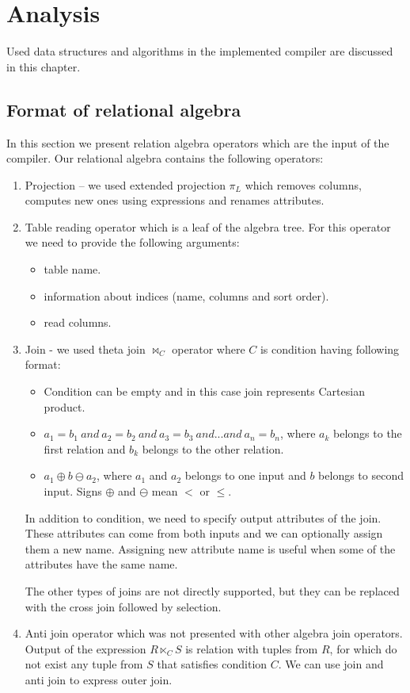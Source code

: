 \chapter{Analysis}
\label{analysis}
Used data structures and algorithms in the implemented compiler are discussed in this chapter.
\section{Format of relational algebra}

In this section we present relation algebra operators which are the input of the compiler. Our relational algebra contains the following operators:
\begin{enumerate}
\item Projection -- we used extended projection $\pi_L$ which removes columns, computes new ones using expressions and renames attributes.

\item Table reading operator which is a leaf of the algebra tree. For this operator we need to provide the following arguments:
\begin{itemize}
\item table name.
\item information about indices (name, columns and sort order).
\item read columns.
\end{itemize}
\item Join - we used theta join $\Join_C$ operator where $C$ is condition having following format:
\begin{itemize}
\item Condition can be empty and in this case join represents Cartesian product.
\item $a_1=b_1~and~a_2=b_2~and~a_3=b_3~and...and~a_n=b_n$, where $a_k$ belongs to the first relation and $b_k$ belongs to the other relation.
\item $a_1\oplus b \ominus a_2$, where $a_1$ and $a_2$ belongs to one input and $b$ belongs to second input. Signs $\oplus$ and $\ominus$ mean $<$ or $\leq$.

\end{itemize}

In addition to condition, we need to specify output attributes of the join. These attributes can come from both inputs and we can optionally assign them a new name. Assigning new attribute name is useful when some of the attributes have the same name.

The other types of joins are not directly supported, but they can be replaced with the cross join followed by selection.
\item Anti join operator which was not presented with other algebra join operators. Output of the expression $R \ltimes_C S$ is relation with tuples from $R$, for which do not exist any tuple from $S$ that satisfies condition $C$. We can use join and anti join to express outer join.
 

\end{enumerate}
